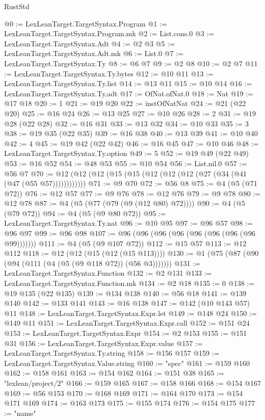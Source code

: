 \begin{lexlean}{RustStd}
\begin{coremodule}
{\begin{coremodule}
{{{{{{{{{{{{{{{{{{{{{{{{{{{{{{{{{{{{{{{{{{{{{{{{{{{{{{{{{{{{{{{{{{{{{{{{{{{{{{{{@0 := LexLeanTarget.TargetSyntax.Program
@1 := LexLeanTarget.TargetSyntax.Program.mk
@2 := List.cons.{0}
@3 := LexLeanTarget.TargetSyntax.Adt
@4 := @2 @3
@5 := LexLeanTarget.TargetSyntax.Adt.mk
@6 := List.{0}
@7 := LexLeanTarget.TargetSyntax.Ty
@8 := @6 @7
@9 := @2 @8
@10 := @2 @7
@11 := LexLeanTarget.TargetSyntax.Ty.bytes
@12 := @10 @11
@13 := LexLeanTarget.TargetSyntax.Ty.list
@14 := @13 @11
@15 := @10 @14
@16 := LexLeanTarget.TargetSyntax.Ty.adt
@17 := OfNat.ofNat.{0}
@18 := Nat
@19 := @17 @18
@20 := 1
@21 := @19 @20
@22 := instOfNatNat
@24 := @21 (@22 @20)
@25 := @16 @24
@26 := @13 @25
@27 := @10 @26
@28 := 2
@31 := @19 @28 (@22 @28)
@32 := @16 @31
@33 := @13 @32
@34 := @10 @33
@35 := 3
@38 := @19 @35 (@22 @35)
@39 := @16 @38
@40 := @13 @39
@41 := @10 @40
@42 := 4
@45 := @19 @42 (@22 @42)
@46 := @16 @45
@47 := @10 @46
@48 := LexLeanTarget.TargetSyntax.Ty.option
@49 := 5
@52 := @19 @49 (@22 @49)
@53 := @16 @52
@54 := @48 @53
@55 := @10 @54
@56 := List.nil.{0}
@57 := @56 @7
@70 := @12 (@12 (@12 (@15 (@15 (@12 (@12 (@12 (@27 (@34 (@41 (@47 (@55 @57))))))))))))
@71 := @9 @70
@72 := @56 @8
@75 := @4 (@5 (@71 @72))
@76 := @12 @57
@77 := @9 @76
@78 := @12 @76
@79 := @9 @78
@80 := @12 @78
@87 := @4 (@5 (@77 (@79 (@9 (@12 @80) @72))))
@90 := @4 (@5 (@79 @72))
@94 := @4 (@5 (@9 @80 @72))
@95 := LexLeanTarget.TargetSyntax.Ty.nat
@96 := @10 @95
@97 := @96 @57
@98 := @96 @97
@99 := @96 @98
@107 := @96 (@96 (@96 (@96 (@96 (@96 (@96 (@96 @99)))))))
@111 := @4 (@5 (@9 @107 @72))
@112 := @15 @57
@113 := @12 @112
@118 := @12 (@12 (@15 (@12 (@15 @113))))
@130 := @1 (@75 (@87 (@90 (@94 (@111 (@4 (@5 (@9 @118 @72)) (@56 @3)))))))
@131 := LexLeanTarget.TargetSyntax.Function
@132 := @2 @131
@133 := LexLeanTarget.TargetSyntax.Function.mk
@134 := @2 @18
@135 := 0
@138 := @19 @135 (@22 @135)
@139 := @134 @138
@140 := @56 @18
@141 := @139 @140
@142 := @133 @141
@143 := @16 @138
@147 := @142 (@10 @143 @57) @11
@148 := LexLeanTarget.TargetSyntax.Expr.let
@149 := @148 @24
@150 := @149 @11
@151 := LexLeanTarget.TargetSyntax.Expr.call
@152 := @151 @24
@153 := LexLeanTarget.TargetSyntax.Expr
@154 := @2 @153
@155 := @151 @31
@156 := LexLeanTarget.TargetSyntax.Expr.value
@157 := LexLeanTarget.TargetSyntax.Ty.string
@158 := @156 @157
@159 := LexLeanTarget.TargetSyntax.Value.string
@160 := "spec"
@161 := @159 @160
@162 := @158 @161
@163 := @154 @162
@164 := @151 @38
@165 := "lexlean/project/2"
@166 := @159 @165
@167 := @158 @166
@168 := @154 @167
@169 := @56 @153
@170 := @168 @169
@171 := @164 @170
@173 := @154 @171 @169
@174 := @163 @173
@175 := @155 @174
@176 := @154 @175
@177 := "name"
}}}}}}}}}}}}}}}}}}}}}}}}}}}}}}}}}}}}}}}}}}}}}}}}}}}}}}}}}}}}}}}}}}}}}}}}}}}}}}}}
\end{coremodule}}
\end{coremodule}
\end{lexlean}
